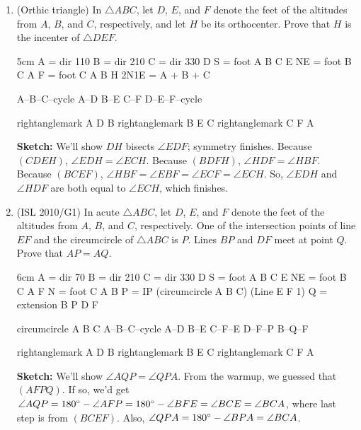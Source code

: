 \documentclass[11pt,paper=letter]{scrartcl}
\begin{document}
\begin{enumerate}

\item (Orthic triangle) In $\triangle ABC$, let $D$, $E$, and $F$ denote the feet of the altitudes from $A$, $B$, and $C$, respectively, and let $H$ be its orthocenter. Prove that $H$ is the incenter of $\triangle DEF$.

\begin{center}
\begin{tsqx}{5cm}
A = dir 110
B = dir 210
C = dir 330
D S = foot A B C
E NE = foot B C A
F = foot C A B
H 2N1E = A + B + C

A--B--C--cycle
A--D
B--E
C--F
D--E--F--cycle

rightanglemark A D B
rightanglemark B E C
rightanglemark C F A
\end{tsqx}
\end{center}

\textbf{Sketch:} We'll show $DH$ bisects $\angle EDF$; symmetry finishes. Because $(CDEH)$, $\angle EDH = \angle ECH$. Because $(BDFH)$, $\angle HDF = \angle HBF$. Because $(BCEF)$, $\angle HBF = \angle EBF = \angle ECF = \angle ECH$. So, $\angle EDH$ and $\angle HDF$ are both equal to $\angle ECH$, which finishes.

\item (ISL 2010/G1) In acute $\triangle ABC$, let $D$, $E$, and $F$ denote the feet of the altitudes from $A$, $B$, and $C$, respectively. One of the intersection points of line $EF$ and the circumcircle of $\triangle ABC$ is $P$. Lines $BP$ and $DF$ meet at point $Q$. Prove that $AP = AQ$.

\begin{center}
\begin{tsqx}{6cm}
A = dir 70
B = dir 210
C = dir 330
D S = foot A B C
E NE = foot B C A
F N = foot C A B
P = IP (circumcircle A B C) (Line E F 1)
Q = extension B P D F

circumcircle A B C
A--B--C--cycle
A--D
B--E
C--F--E
D--F--P
B--Q--F

rightanglemark A D B
rightanglemark B E C
rightanglemark C F A
\end{tsqx}
\end{center}

\textbf{Sketch:} We'll show $\angle AQP = \angle QPA$. From the warmup, we guessed that $(AFPQ)$. If so, we'd get $\angle AQP = 180^\circ - \angle AFP = 180^\circ - \angle BFE = \angle BCE = \angle BCA$, where last step is from $(BCEF)$. Also, $\angle QPA = 180^\circ - \angle BPA = \angle BCA$.


\end{enumerate}
\end{document}
